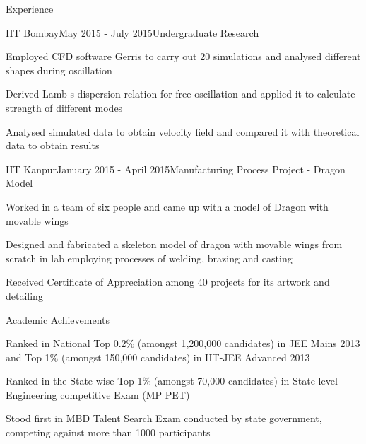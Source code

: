 \documentclass{article}
\begin{document}
\begin{rSection}{Experience}

\begin{rSubsection}{IIT Bombay}{May 2015 - July 2015}{Undergraduate Research}{}
\item Employed CFD software Gerris to carry out 20 simulations and analysed different shapes during oscillation
\item Derived Lamb s dispersion relation for free oscillation and applied it to calculate strength of different modes
\item Analysed simulated data to obtain velocity field and compared it with theoretical data to obtain results
\end{rSubsection}



\begin{rSubsection}{IIT Kanpur}{January 2015 - April 2015}{Manufacturing Process Project - Dragon Model}{}
\item Worked in a team of six people and came up with a model of Dragon with movable wings 
\item Designed and fabricated a skeleton model of dragon with movable wings from scratch in lab employing processes of welding, brazing and casting
\item Received Certificate of Appreciation among 40 projects for its artwork and detailing
\end{rSubsection}

\end{rSection}



\begin{rSection}{Academic Achievements} \itemsep -2pt
\item Ranked in National Top 0.2\% (amongst 1,200,000 candidates) in JEE Mains 2013 and Top 1\% (amongst 150,000 candidates) in IIT-JEE Advanced 2013
\item Ranked in the State-wise Top 1\% (amongst 70,000 candidates) in State level Engineering competitive Exam (MP PET)
\item Stood first in MBD Talent Search Exam conducted by state government, competing against more than 1000 participants  
\end{rSection}
\end{document}
